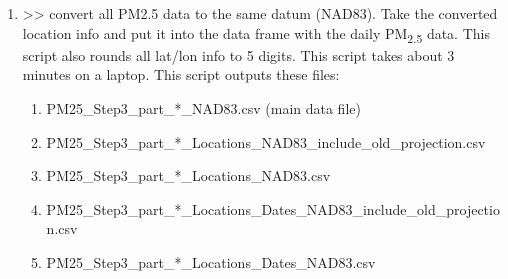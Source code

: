 \begin{enumerate}[nolistsep]
\begin{enumerate}[nolistsep]
	\end{enumerate}

\item {} >> convert all PM2.5 data to the same datum (NAD83). Take the converted location info and put it into the data frame with the daily PM\textsubscript{2.5} data. This script also rounds all lat/lon info to 5 digits. This script takes about 3 minutes on a laptop. This script outputs these files:

\begin{enumerate}[nolistsep]
\item PM25\_Step3\_part\_*\_NAD83.csv (main data file)
\item PM25\_Step3\_part\_*\_Locations\_NAD83\_include\_old\_projection.csv
\item PM25\_Step3\_part\_*\_Locations\_NAD83.csv
\item PM25\_Step3\_part\_*\_Locations\_Dates\_NAD83\_include\_old\_projection.csv
\item PM25\_Step3\_part\_*\_Locations\_Dates\_NAD83.csv
\end{enumerate}


\end{enumerate}
